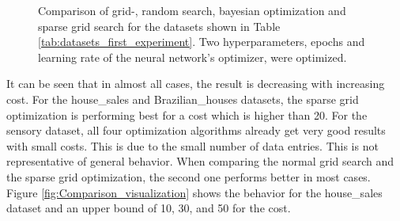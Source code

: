 \begin{figure}[H]
	\caption{ Comparison of grid-, random search, bayesian optimization and sparse grid search for the datasets shown in Table \ref{tab:datasets_first_experiment}. Two hyperparameters, epochs and learning rate of the neural network's optimizer, were optimized. }	
	\label{fig:result_first_comparison}
\end{figure}

It can be seen that in almost all cases, the result is decreasing with increasing cost. For the house\_sales and Brazilian\_houses datasets, the sparse grid optimization is performing best for a cost which is higher than 20. For the sensory dataset, all four optimization algorithms already get very good results with small costs. This is due to the small number of data entries. This is not representative of general behavior. When comparing the normal grid search and the sparse grid optimization, the second one performs better in most cases. Figure \ref{fig:Comparison_visualization} shows the behavior for the house\_sales dataset and an upper bound of 10, 30, and 50 for the cost.

